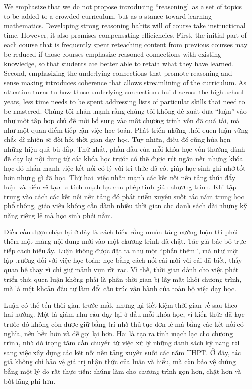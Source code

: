 \documentclass[
  10pt,
  a4paper,
  landscape,
  twoside,
  openany
]{scrbook}
\newcommand{\EN}[1]{#1}
\newcommand{\VI}[1]{#1}
\newcommand{\NOTE}[1]{#1}
\begin{document}
\TriPara
{
\EN{We emphasize that we do not propose introducing ``reasoning'' as a set of topics to be added to a crowded curriculum, but as a stance toward learning mathematics. Developing strong reasoning habits will of course take instructional time. However, it also promises compensating efficiencies. First, the initial part of each course that is frequently spent reteaching content from previous courses may be reduced if those courses emphasize reasoned connections with existing knowledge, so that students are better able to retain what they have learned. Second, emphasizing the underlying connections that promote reasoning and sense making introduces coherence that allows streamlining of the curriculum. As attention turns to how those underlying connections build across the high school years, less time needs to be spent addressing lists of particular skills that need to be mastered.}
}
{
\VI{Chúng tôi nhấn mạnh rằng chúng tôi không đề xuất đưa ``luận'' vào như một tập hợp chủ đề mới bổ sung vào một chương trình vốn đã quá tải, mà như một quan điểm tiếp cận việc học toán. Phát triển những thói quen luận vững chắc dĩ nhiên sẽ đòi hỏi thời gian dạy học. Tuy nhiên, điều đó cũng hứa hẹn những hiệu quả bù đắp. Thứ nhất, phần đầu của mỗi khóa học vốn thường dành để dạy lại nội dung từ các khóa học trước có thể được rút ngắn nếu những khóa học đó nhấn mạnh việc kết nối có lý với tri thức đã có, giúp học sinh ghi nhớ tốt hơn những gì đã học. Thứ hai, việc nhấn mạnh các kết nối nền tảng thúc đẩy luận và hiểu sẽ tạo ra tính mạch lạc cho phép tinh giản chương trình. Khi tập trung vào cách các kết nối nền tảng đó phát triển xuyên suốt các năm trung học phổ thông, giáo viên không cần dành nhiều thời gian cho danh sách dài những kỹ năng riêng lẻ mà học sinh phải nắm.}
}
{
\NOTE{Điều cần được chặn lại ở đây là cách hiểu rằng muốn tăng cường luận thì phải thêm một mảng nội dung mới vào một chương trình đã chật. Tác giả bác bỏ trực tiếp cách hiểu ấy. Luận không được đặt ra như một ``phần thêm'', mà như một lập trường đối với việc học toán: học bằng cách nối cái mới với cái đã biết, thấy quan hệ thay vì chỉ giữ mảnh vụn rời rạc. Vì thế, thời gian dành cho việc phát triển thói quen luận không phải là phần thời gian bị lấy mất khỏi chương trình, mà là một khoản đầu tư làm đổi cấu trúc vận hành của toàn bộ việc dạy học.

Luận có thể tốn thời gian trước mắt, nhưng lại tiết kiệm thời gian về sau theo hai hướng. Một là giảm nhu cầu dạy lại ở đầu mỗi khóa học, vì kiến thức đã học trước đó không còn được giữ bằng trí nhớ thủ tục đơn lẻ mà bằng các kết nối có nghĩa, nên bền hơn và dễ gọi lại hơn. Hai là tạo ra tính mạch lạc cho chương trình, nhờ đó trọng tâm dần chuyển từ việc xử lý những danh sách kỹ năng rời sang việc xây dựng các kết nối nền tảng xuyên suốt các năm THPT. Ở đây, tác giả không chỉ bảo vệ giá trị nhận thức của luận và hiểu, mà còn bảo vệ chúng bằng một lý do rất thực tiễn: chúng làm cho chương trình gọn hơn, chặt hơn và bớt lãng phí hơn.}
}
\end{document}
